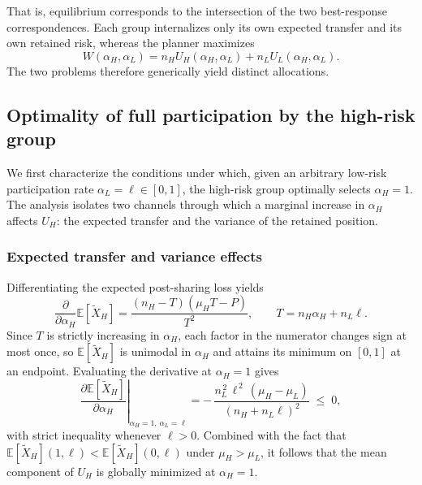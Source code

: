 \documentclass[a4paper,12pt]{article}
\theoremstyle{definition}
\theoremstyle{remark}
\newcommand{\E}{\mathbb{E}}
\newcommand{\1}{\mathbf{1}}
\begin{document}
That is, equilibrium corresponds to the intersection of the two best-response correspondences. Each group internalizes only its own expected
transfer and its own retained risk, whereas the planner maximizes
\[
W(\alpha_H,\alpha_L)=n_HU_H(\alpha_H,\alpha_L)+n_LU_L(\alpha_H,\alpha_L).
\]
The two problems therefore generically yield distinct allocations.

\subsection{Optimality of full participation by the high-risk group}
\label{sec:decentralized-fullH}

We first characterize the conditions under which, given an arbitrary
low-risk participation rate \(\alpha_L=\ell\in[0,1]\), the high-risk group
optimally selects \(\alpha_H=1\). The analysis isolates two channels through
which a marginal increase in \(\alpha_H\) affects \(U_H\): the expected
transfer and the variance of the retained position.

\subsubsection{Expected transfer and variance effects}

Differentiating the expected post-sharing loss yields
\[
\frac{\partial}{\partial \alpha_H}\E[\tilde X_H]
=
\frac{(n_H-T)(\mu_HT-P)}{T^2},
\qquad
T=n_H\alpha_H+n_L\ell.
\]
Since \(T\) is strictly increasing in \(\alpha_H\), each factor in the
numerator changes sign at most once, so \(\E[\tilde X_H]\) is unimodal in
\(\alpha_H\) and attains its minimum on \([0,1]\) at an endpoint. Evaluating
the derivative at \(\alpha_H=1\) gives
\begin{equation}
\left.\frac{\partial \E[\tilde X_H]}{\partial \alpha_H}\right|_{\alpha_H=1,\,\alpha_L=\ell}
=
-\,\frac{n_L^{\,2}\,\ell^{\,2}\,(\mu_H-\mu_L)}{(n_H+n_L\ell)^{2}}
\;\le\;0,
\label{eq:dEH-dalphaH-at1}
\end{equation}
with strict inequality whenever \(\ell>0\). Combined with the fact that
\(\E[\tilde X_H](1,\ell)<\E[\tilde X_H](0,\ell)\) under \(\mu_H>\mu_L\), it
follows that the mean component of \(U_H\) is globally minimized at
\(\alpha_H=1\).
\end{document}
